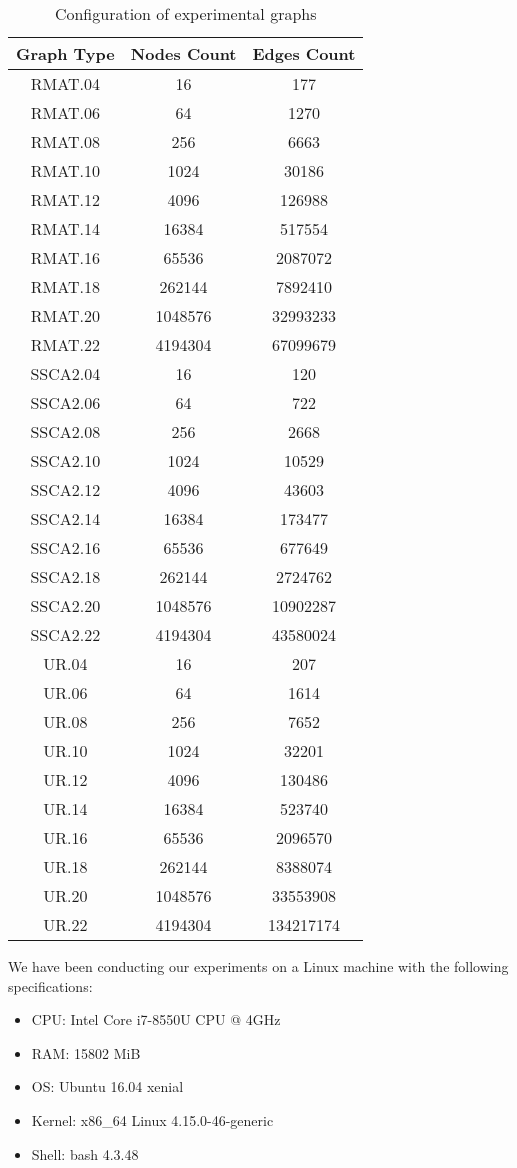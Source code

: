 \documentclass{svproc}
\begin{document}
\begin{table}[]
\caption{Configuration of experimental graphs}
\label{tabular:graphs}
\begin{center}
\begin{tabular}{c|c|c}
Graph Type & Nodes Count & Edges Count \\
\hline
RMAT.04 & 16 & 177 \\
RMAT.06 & 64 & 1270 \\
RMAT.08 & 256 & 6663 \\
RMAT.10 & 1024 & 30186 \\
RMAT.12 & 4096 & 126988 \\
RMAT.14 & 16384 & 517554 \\
RMAT.16 & 65536 & 2087072 \\
RMAT.18 & 262144 & 7892410 \\
RMAT.20 & 1048576 & 32993233 \\
RMAT.22 & 4194304 & 67099679 \\
SSCA2.04 & 16 & 120 \\
SSCA2.06 & 64 & 722 \\
SSCA2.08 & 256 & 2668 \\
SSCA2.10 & 1024 & 10529 \\
SSCA2.12 & 4096 & 43603 \\
SSCA2.14 & 16384 & 173477 \\
SSCA2.16 & 65536 & 677649 \\
SSCA2.18 & 262144 & 2724762 \\
SSCA2.20 & 1048576 & 10902287 \\
SSCA2.22 & 4194304 & 43580024 \\
UR.04 & 16 & 207 \\
UR.06 & 64 & 1614 \\
UR.08 & 256 & 7652 \\
UR.10 & 1024 & 32201 \\
UR.12 & 4096 & 130486 \\
UR.14 & 16384 & 523740 \\
UR.16 & 65536 & 2096570 \\
UR.18 & 262144 & 8388074 \\
UR.20 & 1048576 & 33553908 \\
UR.22 & 4194304 & 134217174
\end{tabular}
\end{center}
\end{table}

We have been conducting our experiments on a Linux machine with the following specifications:
\begin{itemize}
    \item CPU: Intel Core i7-8550U CPU @ 4GHz
    \item RAM: 15802 MiB
    \item OS: Ubuntu 16.04 xenial
    \item Kernel: x86\_64 Linux 4.15.0-46-generic
    \item Shell: bash 4.3.48
\end{itemize}
\end{document}
